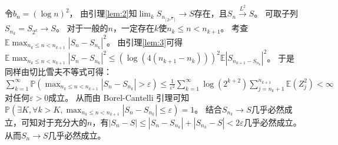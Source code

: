 \documentclass{ctexart}
\newcommand{\ceil}[1]{\lceil #1\rceil}
\begin{document}
\begin{solution}
  令\(b_n = ( \log n )^2 \)， 由引理\ref{lem:2}知\(\lim_{k} S_{n_{\ceil{2^{\sqrt{k}}}}} \to S \)存在，且\(S_n \overset{L^2}{\to} S \)。
  可取子列\(S_{n_k}=S_{2^k} \to S\)。
  对于一般的\(n \)，一定存在\(k \)使\(n_k \leq n < n_{k + 1} \)。
  考查\(\mathbb{E} \max_{n_k \leq n < n_{k + 1}} |S_n - S_{n_k}|^2 \)。
  由引理\ref{lem:3}可得\(\mathbb{E} \max_{n_k \leq n < n_{k + 1}} |S_n - S_{n_k}|^2 \leq (\log(4( n_{k + 1}-n_k )))^2 \mathbb{E} |S_{n_{k + 1}-S_{n_k}}|^2\)。
  于是同样由切比雪夫不等式可得：
  \(\sum_{k=1}^{\infty}\mathbb{P}(\max_{n_k \leq n < n_{k + 1}} |S_n-S_{n_k}| > \varepsilon)\leq \frac{1}{\varepsilon^2} \sum_{k=1}^{\infty} \log(2^{k+2}) \sum_{j=n_k+1}^{n_{k+1}}\mathbb{E}(Z_j^2) < \infty \)对任何\(\varepsilon>0 \)成立。
  从而由 Borel-Cantelli 引理可知\(\mathbb{P}(\exists K, \forall k>K,\max_{n_k \leq n < n_{k + 1}} |S_n-S_{n_k}| \leq \varepsilon)=1 \)。
  结合\(S_{n_k} \to S \)几乎必然成立，可知对于充分大的\(n \)，有\(|S_n-S| \leq |S_n - S_{n_k}| + |S_{n_k}-S| < 2 \varepsilon \)几乎必然成立。
  从而\(S_n \to S \)几乎必然成立。
\end{solution}
\end{document}
